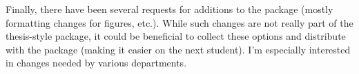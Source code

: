 \documentclass[12pt]{report}
\begin{document}
\begin{singlespace}
  Finally, there have been several requests for additions to the package
  (mostly formatting changes for figures, etc.). While such changes are not
  really part of the thesis-style package, it could be beneficial to collect
  these options and distribute with the package (making it easier on the next
  student).  I'm especially interested in changes needed by various
  departments.

\end{singlespace}
\end{document}
